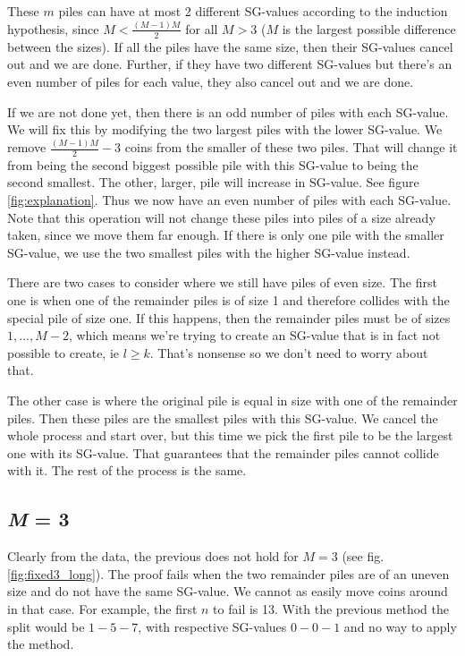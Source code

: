 \documentclass[english,a4paper,twoside]{amsart}
\theoremstyle{lemma}
\begin{document}
These $m$ piles can have at most 2 different SG-values according to the induction hypothesis,
since $M < \frac{(M-1)M}{2}$ for all $M > 3$ ($M$ is the largest possible difference between the sizes).
If all the piles have the same size, then their SG-values cancel out and we are done.
Further, if they have two different SG-values but there's an even number of piles for each value, they
also cancel out and we are done.

If we are not done yet, then there is an odd number of piles with each SG-value.
We will fix this by modifying the two largest piles with the lower SG-value. We remove $\frac{(M-1)M}{2} - 3$
coins from the smaller of these two piles. That will change it from being the second biggest possible
pile with this SG-value to being the second smallest. The other, larger, pile will increase in SG-value.
See figure \ref{fig:explanation}.
Thus we now have an even number of piles with each SG-value. Note that this operation will not
change these piles into piles of a size already taken, since we move them far enough.
If there is only one pile with the smaller SG-value, we use the two smallest piles with the
higher SG-value instead.

There are two cases to consider where we still have piles of even size. The first one is when one of the
remainder piles is of size 1 and therefore collides with the special pile of size one. If this happens,
then the remainder piles must be of sizes $1, ..., M-2$, which means we're trying to create
an SG-value that is in fact not possible to create, ie $l \geq k$. That's nonsense so we don't need
to worry about that.

The other case is where the original pile is equal in size with one of the remainder piles. Then these
piles are the smallest piles with this SG-value. We cancel the whole process and start over, but this
time we pick the first pile to be the largest one with its SG-value. That guarantees that the remainder
piles cannot collide with it. The rest of the process is the same.

\subsection{\emph{M} = 3}
Clearly from the data, the previous does not hold for $M=3$ (see fig. \ref{fig:fixed3_long}).
The proof fails when the two remainder
piles are of an uneven size and do not have the same SG-value. We cannot as easily move coins around
in that case. For example, the first $n$ to fail is 13. With the previous method the split would be
$1 - 5 - 7$, with respective SG-values $0 - 0 - 1$ and no way to apply the method.
\end{document}
